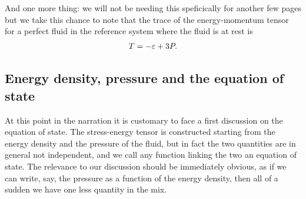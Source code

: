 And one more thing: we will not be needing this speficically for another few pages
but we take this chance to note that the trace of the energy-momentum tensor for
a perfect fluid in the reference system where the fluid is at rest is
\begin{align}\label{eq:energy_momentum_tensor_trace}
  T = -\varepsilon + 3P.
\end{align}



\subsection{Energy density, pressure and the equation of state}

At this point in the narration it is customary to face a first discussion on the
equation of state. The stress-energy tensor is constructed starting from the energy
density and the pressure of the fluid, but in fact the two quantities are in general
not independent, and we call any function linking the two an equation of state.
The relevance to our discussion should be immediately obvious, as if we can write,
say, the pressure as a function of the energy density, then all of a sudden we
have one less quantity in the mix.

